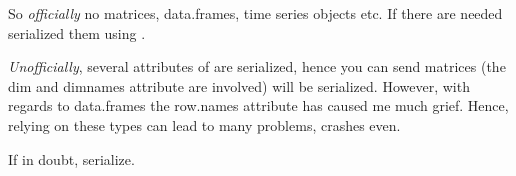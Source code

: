 \documentclass[letterpaper,10pt,english]{manual}
\begin{document}
So \emph{officially} no matrices, data.frames, time series objects etc. If there are needed serialized them using  .

\emph{Unofficially}, several attributes of are serialized, hence you can send matrices (the dim and  dimnames attribute are involved) will be serialized.
However, with regards to data.frames the row.names attribute has caused me much grief. Hence, relying on these types can lead to many problems, crashes even.

If in doubt, serialize.


\renewcommand{\indexname}{Module Index}
\printmodindex
\renewcommand{\indexname}{Index}
\printindex
\end{document}
